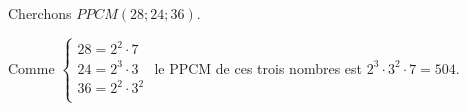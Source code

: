             \begin{ex}
                  Cherchons $PPCM(28;24;36)$.
                  
                  Comme 
                  $
                  \left\lbrace
                  \begin{array}{l}
                        28 = 2^2 \cdot 7 \\
                        24 = 2^3 \cdot 3 \\
                        36 = 2^2 \cdot 3^2 \\
                  \end{array}
                  \right.
                  $
                  le PPCM de ces trois nombres est $2^3 \cdot 3^2 \cdot 7 = 504$.
            \end{ex}

